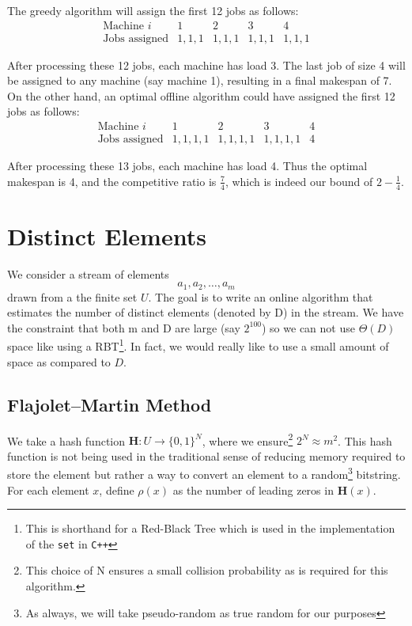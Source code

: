 The greedy algorithm will assign the first 12 jobs as follows:
\[
\begin{array}{c|cccc}
\text{Machine }i & 1 & 2 & 3 & 4\\
\hline
\text{Jobs assigned} & 1,1,1 & 1,1,1 & 1,1,1 & 1,1,1
\end{array}
\]

After processing these 12 jobs, each machine has load 3. The last job of size 4 will be assigned to any machine (say machine 1), resulting in a final makespan of 7.
On the other hand, an optimal offline algorithm could have assigned the first 12 jobs as follows:
\[
\begin{array}{c|cccc}
\text{Machine }i & 1 & 2 & 3 & 4\\
\hline
\text{Jobs assigned} & 1,1,1,1 & 1,1,1,1 & 1,1,1,1 & 4
\end{array}
\]

After processing these 13 jobs, each machine has load 4. Thus the optimal makespan is 4,
 and the competitive ratio is $\frac{7}{4}$, which is indeed our bound of $2-\frac{1}{4}$.











\section{Distinct Elements}

We consider a stream of elements
\[
a_1,a_2,\dots,a_m
\]
drawn from a the finite set \(U\). The goal is to write an online algorithm that estimates 
the number of distinct elements (denoted by D) in the stream. We have the constraint that both
m and D are large (say $2^{100}$) so we can not use $\Theta(D)$ space like using a RBT\footnote{This 
is shorthand for a Red-Black Tree which is used in the implementation of the \texttt{set} in \texttt{C++}}. 
In fact, we would really like to use a small amount of space as compared to $D$.


\subsection{Flajolet–Martin Method}
We take a hash function $\mathbf{H}:U \to \{0,1\}^{N}$, where we ensure\footnote{This choice of N ensures 
a small collision probability as is required for this algorithm.} $2^N \approx m^2$. This hash function is not being 
used in the traditional sense of reducing memory required to store the element but rather a 
way to convert an element to a random\footnote{As always, we will take pseudo-random as 
true random for our purposes} bitstring. For each element \(x\), 
define \(\rho(x)\) as the number of leading zeros in \(\mathbf{H}(x)\). \\


